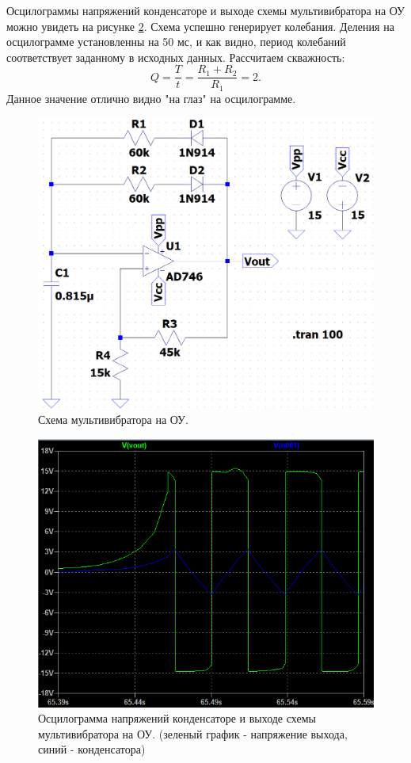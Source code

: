 Осцилограммы напряжений конденсаторе и выходе схемы мультивибратора на ОУ
можно увидеть на рисунке \ref{fig:U1}. Схема успешно генерирует колебания.
Деления на осцилограмме установленны на 50 мс, и как видно,
период колебаний соответствует заданному в исходных данных.
Рассчитаем скважность:
\begin{equation*}
    Q=\frac{T}{t}=\frac{R_1+R_2}{R_1}=2. 
\end{equation*}
Данное значение отлично видно "на глаз" на осцилограмме.


\begin{figure}[H]
    \centering
    \includegraphics[width=\linewidth]{figs/мультивибр_оу_схема.png}
    \caption{Схема мультивибратора на ОУ.}
    \label{fig:мультивибр_оу_схема}
\end{figure}

\begin{figure}[H]
    \centering
    \includegraphics[width=\linewidth]{figs/U1.png}
    \caption{Осцилограмма напряжений конденсаторе и выходе схемы мультивибратора на ОУ. (зеленый график - напряжение выхода, синий - конденсатора)}
    \label{fig:U1}
\end{figure}


